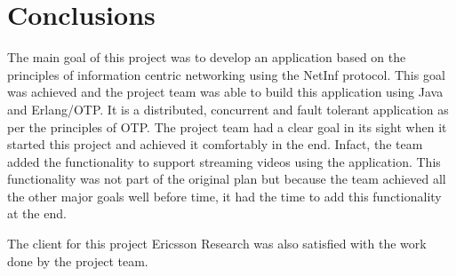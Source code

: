 \section{Conclusions}
The main goal of this project was to develop an application based on the principles of information centric networking using the NetInf protocol. This goal was achieved and the project team was able to build this application using Java and Erlang/OTP. It is a distributed, concurrent and fault tolerant application as per the principles of OTP. The project team had a clear goal in its sight when it started this project and achieved it comfortably in the end. Infact, the team added the functionality to support streaming videos using the application. This functionality was not part of the original plan but because the team achieved all the other major goals well before time, it had the time to add this functionality at the end. 

The client for this project Ericsson Research was also satisfied with the work done by the project team. 
